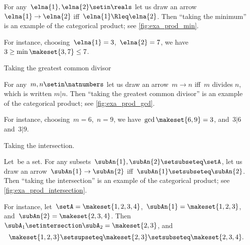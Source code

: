 \begin{example}
    \label{exa:min-as-prod}
    For any~$\elna{1},\elna{2}\setin \reals$ let us draw an arrow~$\elna{1}\to \elna{2}$ iff~$\elna{1}\Rleq \elna{2}$.
    Then ``taking the minimum'' is an example of the categorical product; see \cref{fig:exa_prod_min}.

    For instance, choosing~$\elna{1} = 3$,~$\elna{2} = 7$, we have~$3 \geq \min \makeset{3, 7} \leq 7$.
\end{example}

\begin{marginfigure}
    \centering
    \caption{Taking the greatest common divisor}
    \label{fig:exa_prod_gcd}
\end{marginfigure}

\begin{example}
    \label{exa:gcd-as-prod}
    For any~$m, n \setin \natnumbers$ let us draw an arrow~$m \to n$ iff~$m$ divides $n$, which is written $m | n$.
    Then ``taking the greatest common divisor'' is an example of the categorical product; see \cref{fig:exa_prod_gcd}.

    For instance, choosing~$m = 6$,~$n = 9$, we have~$\gcd \makeset{6, 9 } = 3$, and~$3 | 6$ and~$3 | 9$.
\end{example}

\begin{marginfigure}
    \centering
    \caption{Taking the intersection.}
    \label{fig:exa_prod_intersection}
\end{marginfigure}

\begin{example}
    \label{exa:intersection-as-prod}
    Let~\setA be a set.
    For any subsets~$\subAn{1}, \subAn{2} \setsubseteq \setA$, let us draw an arrow~$\subAn{1} \to \subAn{2}$ iff~$\subAn{1} \setsubseteq \subAn{2}$.
    Then ``taking the intersection'' is an example of the categorical product; see \cref{fig:exa_prod_intersection}.

    For instance, let~$\setA = \makeset{ 1, 2, 3, 4 }$,~$\subAn{1} = \makeset{ 1, 2, 3 }$, and~$\subAn{2} = \makeset{2, 3, 4 }$.
    Then~$\subA_1 \setintersection \subA_2 = \makeset{2, 3 }$, and
    \begin{equation}
        \makeset{ 1, 2, 3 } \setsupseteq \makeset{2, 3 } \setsubseteq \makeset{2, 3, 4 }.
    \end{equation}
\end{example}


